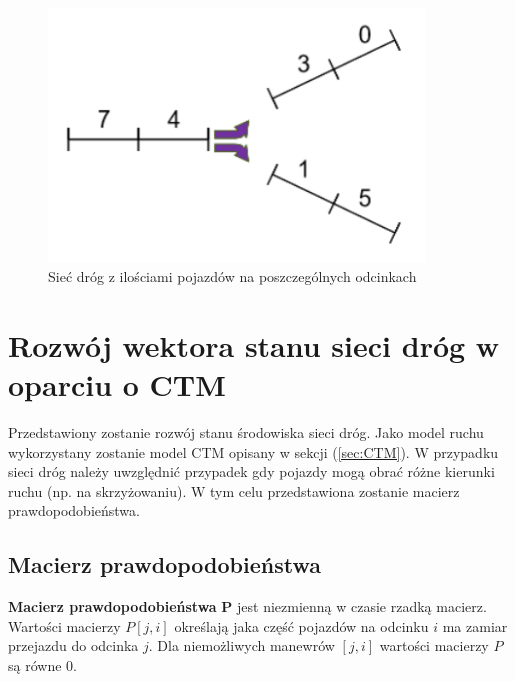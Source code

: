 \documentclass[12pt]{book}
\theoremstyle{plain}
\newcommand{\myref}[1]{(\ref{#1})}
\begin{document}
\begin{figure}[H]
	\centering
	\includegraphics[width=10cm]{images/env_11_743015}
	\caption{Sieć dróg z ilościami pojazdów na poszczególnych odcinkach}
	\label{fig:3_single_road}
\end{figure}

\section{Rozwój wektora stanu sieci dróg w oparciu o CTM}
Przedstawiony zostanie rozwój stanu środowiska sieci dróg. Jako model ruchu wykorzystany zostanie model CTM opisany w sekcji \myref{sec:CTM}. W przypadku sieci dróg należy uwzględnić przypadek  gdy pojazdy mogą obrać różne kierunki ruchu (np. na skrzyżowaniu). W tym celu przedstawiona zostanie macierz prawdopodobieństwa. 
\subsection{Macierz prawdopodobieństwa} \label{sec:macierz_prawd}
\textbf{Macierz prawdopodobieństwa} \textbf{P} jest niezmienną w czasie rzadką macierz. Wartości macierzy $P[j,i]$ określają jaka część pojazdów na odcinku $i$ ma zamiar przejazdu do odcinka $j$. Dla niemożliwych manewrów $[j,i]$ wartości macierzy $P$ są równe 0.
\end{document}

